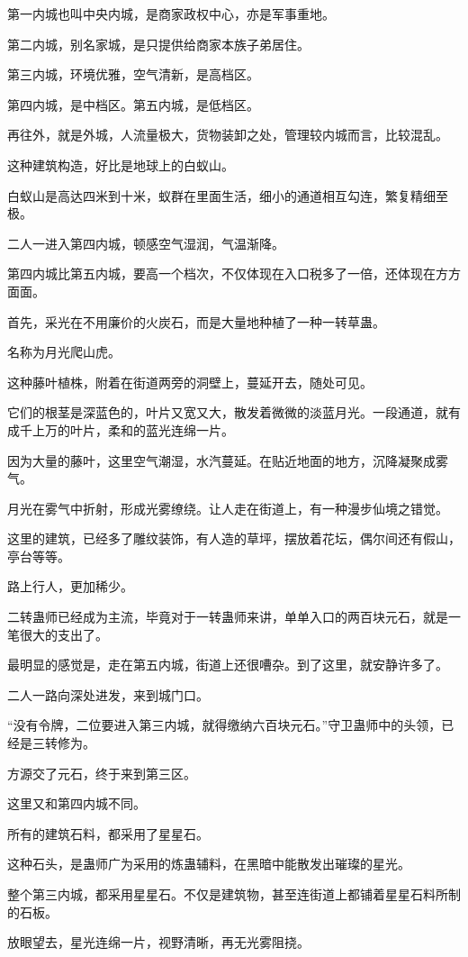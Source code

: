 \begin{this_body}
第一内城也叫中央内城，是商家政权中心，亦是军事重地。

第二内城，别名家城，是只提供给商家本族子弟居住。

第三内城，环境优雅，空气清新，是高档区。

第四内城，是中档区。第五内城，是低档区。

再往外，就是外城，人流量极大，货物装卸之处，管理较内城而言，比较混乱。

这种建筑构造，好比是地球上的白蚁山。

白蚁山是高达四米到十米，蚁群在里面生活，细小的通道相互勾连，繁复精细至极。

二人一进入第四内城，顿感空气湿润，气温渐降。

第四内城比第五内城，要高一个档次，不仅体现在入口税多了一倍，还体现在方方面面。

首先，采光在不用廉价的火炭石，而是大量地种植了一种一转草蛊。

名称为月光爬山虎。

这种藤叶植株，附着在街道两旁的洞壁上，蔓延开去，随处可见。

它们的根茎是深蓝色的，叶片又宽又大，散发着微微的淡蓝月光。一段通道，就有成千上万的叶片，柔和的蓝光连绵一片。

因为大量的藤叶，这里空气潮湿，水汽蔓延。在贴近地面的地方，沉降凝聚成雾气。

月光在雾气中折射，形成光雾缭绕。让人走在街道上，有一种漫步仙境之错觉。

这里的建筑，已经多了雕纹装饰，有人造的草坪，摆放着花坛，偶尔间还有假山，亭台等等。

路上行人，更加稀少。

二转蛊师已经成为主流，毕竟对于一转蛊师来讲，单单入口的两百块元石，就是一笔很大的支出了。

最明显的感觉是，走在第五内城，街道上还很嘈杂。到了这里，就安静许多了。

二人一路向深处进发，来到城门口。

“没有令牌，二位要进入第三内城，就得缴纳六百块元石。”守卫蛊师中的头领，已经是三转修为。

方源交了元石，终于来到第三区。

这里又和第四内城不同。

所有的建筑石料，都采用了星星石。

这种石头，是蛊师广为采用的炼蛊辅料，在黑暗中能散发出璀璨的星光。

整个第三内城，都采用星星石。不仅是建筑物，甚至连街道上都铺着星星石料所制的石板。

放眼望去，星光连绵一片，视野清晰，再无光雾阻挠。


\end{this_body}
